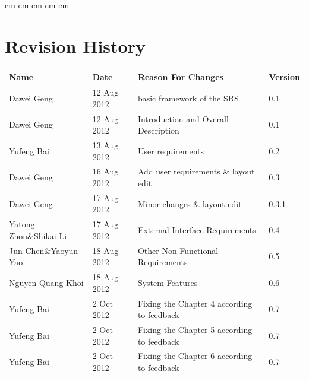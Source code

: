 \documentclass[11pt, a4paper]{report}
\begin{document}
 cm
 cm
 cm
 cm
 cm

\tableofcontents






\clearpage
\section*{Revision History}
\begin{tabular}{| l | l | l | l | }
\hline
Name                        &   Date        	    &	Reason For Changes                  	         	&	Version     	\\ \hline
Dawei Geng                  & 	12 Aug 2012    	    & 	basic framework of the SRS     			    	    &	0.1             \\ \hline
Dawei Geng                  &	12 Aug 2012    	    & 	Introduction and Overall Description             	&	0.1             \\ \hline
Yufeng Bai                  &	13 Aug 2012 	    &	User requirements 						         	&	0.2  			\\ \hline
Dawei Geng                  &	16 Aug 2012		    &	Add user requirements \& layout edit	          	&	0.3 			\\ \hline
Dawei Geng                  &	17 Aug 2012         &	Minor changes \& layout edit			        	&	0.3.1 			\\ \hline
Yatong Zhou\&Shikai Li      &	17 Aug 2012		    &		External Interface Requirements 				&	0.4				\\ \hline
Jun Chen\&Yaoyun Yao		&	18 Aug 2012		    &		Other Non-Functional Requirements				&	0.5				\\ \hline
Nguyen Quang Khoi			&	18 Aug 2012		    &		System Features			                    	&	0.6				\\ \hline
Yufeng Bai		            &	2 Oct 2012		&	Fixing the Chapter 4 according to feedback	     	&	0.7				\\ \hline
Yufeng Bai		            &	2 Oct 2012		&	Fixing the Chapter 5 according to feedback	        &	0.7				\\ \hline
Yufeng Bai		            &	2 Oct 2012		&	Fixing the Chapter 6 according to feedback	        &	0.7				\\ \hline

\end{tabular}
\end{document}
